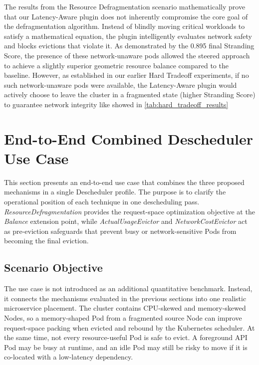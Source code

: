 The results from the Resource Defragmentation scenario mathematically prove that our Latency-Aware plugin does not inherently compromise the core goal of the defragmentation algorithm. Instead of blindly moving critical workloads to satisfy a mathematical equation, the plugin intelligently evaluates network safety and blocks evictions that violate it. As demonstrated by the 0.895 final Stranding Score, the presence of these network-unaware pods allowed the steered approach to achieve a slightly superior geometric resource balance compared to the baseline. However, as established in our earlier Hard Tradeoff experiments, if no such network-unaware pods were available, the Latency-Aware plugin would actively choose to leave the cluster in a fragmented state (higher Stranding Score) to guarantee network integrity like showed in \ref{tab:hard_tradeoff_results}

\section{End-to-End Combined Descheduler Use Case}
\label{sec:end_to_end_microservice_usecase}

This section presents an end-to-end use case that combines the three proposed mechanisms in a single Descheduler profile. The purpose is to clarify the operational position of each technique in one descheduling pass. \textit{ResourceDefragmentation} provides the request-space optimization objective at the \textit{Balance} extension point, while \textit{ActualUsageEvictor} and \textit{NetworkCostEvictor} act as pre-eviction safeguards that prevent busy or network-sensitive Pods from becoming the final eviction.

\subsection{Scenario Objective}

The use case is not introduced as an additional quantitative benchmark. Instead, it connects the mechanisms evaluated in the previous sections into one realistic microservice placement. The cluster contains CPU-skewed and memory-skewed Nodes, so a memory-shaped Pod from a fragmented source Node can improve request-space packing when evicted and rebound by the Kubernetes scheduler. At the same time, not every resource-useful Pod is safe to evict. A foreground API Pod may be busy at runtime, and an idle Pod may still be risky to move if it is co-located with a low-latency dependency.

